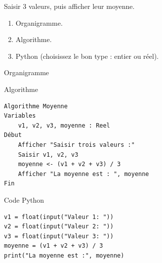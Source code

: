\documentclass[12pt,a4paper]{article}
\begin{document}
\begin{exobox}[title=\textbf{Exercice 5 — Moyenne de 3 valeurs}]
Saisir 3 valeurs, puis afficher leur moyenne.
\end{exobox}

\begin{taskbox}
\begin{enumerate}
  \item Organigramme.
  \item Algorithme.
  \item Python (choisissez le bon type : entier ou réel).
\end{enumerate}
\end{taskbox}

\begin{ansbox}{Organigramme}
\end{ansbox}

\begin{ansbox}{Algorithme}
\begin{verbatim}
Algorithme Moyenne
Variables
    v1, v2, v3, moyenne : Reel
Début
    Afficher "Saisir trois valeurs :"
    Saisir v1, v2, v3
    moyenne <- (v1 + v2 + v3) / 3
    Afficher "La moyenne est : ", moyenne
Fin
\end{verbatim}
\end{ansbox}

\begin{ansbox}{Code Python}
\begin{verbatim}
v1 = float(input("Valeur 1: "))
v2 = float(input("Valeur 2: "))
v3 = float(input("Valeur 3: "))
moyenne = (v1 + v2 + v3) / 3
print("La moyenne est :", moyenne)
\end{verbatim}
\end{ansbox}
\end{document}
